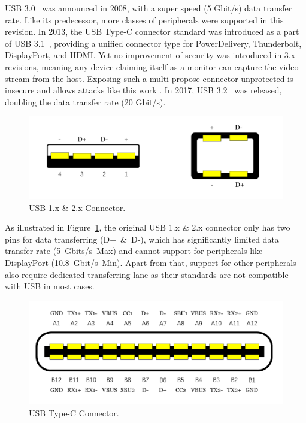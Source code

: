 \ac{USB} 3.0~\cite{usb30} was announced in 2008, with a super speed (5 Gbit/s) data
transfer rate. Like its predecessor, more classes of peripherals were supported
in this revision. In 2013, the \ac{USB} Type-C connector standard was introduced as a
part of \ac{USB} 3.1~\cite{usb31}, providing a unified connector type for
PowerDelivery, Thunderbolt, DisplayPort, and HDMI.  Yet no improvement of
security was introduced in 3.x revisions, meaning any device claiming
itself as a monitor can capture the video stream from the host. Exposing
such a multi-propose connector unprotected is insecure and allows attacks like
this work \tool. In 2017, \ac{USB} 3.2~\cite{usb32} was released, doubling the data
transfer rate (20 Gbit/s).

\begin{figure}[t]
    \centering
	\includegraphics[width=0.7\linewidth]{./Figs/usb_conn.png}
	\caption{\ac{USB} 1.x \& 2.x Connector.}
	\label{fig:usb_conn}
\end{figure}

As illustrated in Figure~\ref{fig:usb_conn}, the original \ac{USB} 1.x \& 2.x
connector only has two pins for data transferring \mbox{(D+ \& D-)}, which has
significantly limited data transfer rate \mbox{(5 Gbits/s Max)} and cannot support for
peripherals like DisplayPort \mbox{(10.8 Gbit/s Min)}. Apart from that, support for
other peripherals also require dedicated transferring lane as their standards
are not compatible with \ac{USB} in most cases.  

\begin{figure}[t] 
	\centering
	\includegraphics[width=\linewidth]{./Figs/usb_c_conn.png} 
	\caption{\ac{USB} Type-C Connector.} 
	\label{fig:usb_c_conn} 
\end{figure}

